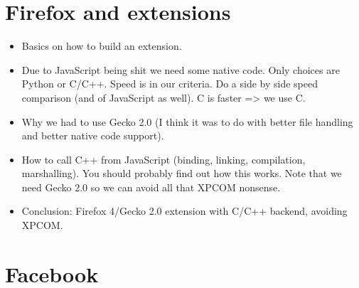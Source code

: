 \section{Firefox and extensions}

\begin{itemize}
    
    \item Basics on how to build an extension.

    \item Due to JavaScript being shit we need some native code. Only choices are Python or C/C++. Speed is in our criteria. Do a side by side speed comparison (and of JavaScript as well). C is faster => we use C.

    \item Why we had to use Gecko 2.0 (I think it was to do with better file handling and better native code support).

    \item How to call C++ from JavaScript (binding, linking, compilation, marshalling). You should probably find out how this works. Note that we need Gecko 2.0 so we can avoid all that XPCOM nonsense.
    
    \item Conclusion: Firefox 4/Gecko 2.0 extension with C/C++ backend, avoiding XPCOM.
    
\end{itemize}

\section{Facebook}

